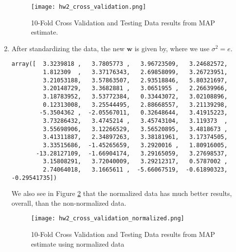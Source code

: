 \documentclass[submit]{harvardml}
\newcommand{\bw}{\mathbf{w}}
\begin{document}
\begin{enumerate}
\begin{figure}[!h]
\centering
\texttt{[image: hw2\_cross\_validation.png]}
\caption{10-Fold Cross Validation and Testing Data results from MAP estimate.}
\label{fig:cross_validation}
\end{figure}

\item After standardizing the data, the new $\bw$ is given by, where we use $\sigma^2 = e$.

\begin{lstlisting}
array([  3.3239818 ,   3.7805773 ,   3.96723509,   3.24682572,
         1.812309  ,   3.37176343,   2.69858099,   3.26723951,
         3.21053188,   3.57863507,   2.93518846,   5.80321697,
         3.20148729,   3.3682881 ,   3.0651955 ,   2.26639966,
         3.18783952,   3.53772384,   0.33443072,   3.02108896,
         0.12313008,   3.25544495,   2.88668557,   3.21139298,
        -5.3504362 ,  -2.05567011,   0.32648644,   3.41915223,
         3.73286432,   3.4745214 ,   3.45743104,   3.119373  ,
         3.55698906,   3.12266529,   3.56520895,   3.4818673 ,
         3.41311887,   2.34897263,   3.38181961,   3.17374505,
         3.33515686,  -1.45265659,   3.2920016 ,   1.80916005,
       -13.28127109,  -1.66904174,   3.29165059,   3.27698537,
         3.15808291,   3.72040009,   3.29212317,   0.5787002 ,
         2.74064018,   3.1665611 ,  -5.66067519,  -0.61890323,  -0.29541735])
\end{lstlisting}

We also see in Figure \ref{fig:cross_validation_normalized} that the normalized data has much better results, overall, than the non-normalized data.

\begin{figure}[!h]
\centering
\texttt{[image: hw2\_cross\_validation\_normalized.png]}
\caption{10-Fold Cross Validation and Testing Data results from MAP estimate using normalized data}
\label{fig:cross_validation_normalized}
\end{figure}


\end{enumerate}
\end{document}
